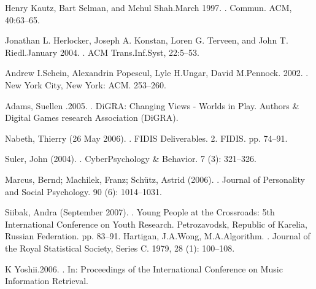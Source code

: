 \begin{thebibliography}{10}
Henry Kautz, Bart Selman, and Mehul Shah.March 1997.
.
\newblock Commun. ACM, 40:63–65.

Jonathan L. Herlocker, Joseph A. Konstan, Loren G. Terveen, and John T. Riedl.January 2004.
.
\newblock ACM Trans.Inf.Syst, 22:5–53.

Andrew I.Schein, Alexandrin Popescul, Lyle H.Ungar, David M.Pennock. 2002.
.
\newblock New York City, New York: ACM. 253–260.

Adams, Suellen .2005.
.
\newblock DiGRA: Changing Views - Worlds in Play. Authors \& Digital Games research Association (DiGRA).

Nabeth, Thierry (26 May 2006).
.
\newblock FIDIS Deliverables. 2. FIDIS. pp. 74–91.

Suler, John (2004).
.
\newblock CyberPsychology \& Behavior. 7 (3): 321–326.

Marcus, Bernd; Machilek, Franz; Schütz, Astrid (2006).
.
\newblock Journal of Personality and Social Psychology. 90 (6): 1014–1031.

Siibak, Andra (September 2007).
.
\newblock Young People at the Crossroads: 5th International Conference on Youth Research. Petrozavodsk, Republic of Karelia, Russian Federation. pp. 83–91.
Hartigan, J.A.Wong, M.A.Algorithm.
.
\newblock Journal of the Royal Statistical Society, Series C. 1979, 28 (1): 100–108.

K Yoshii.2006.
.
\newblock In: Proceedings of the International Conference on Music Information Retrieval.


\end{thebibliography}
